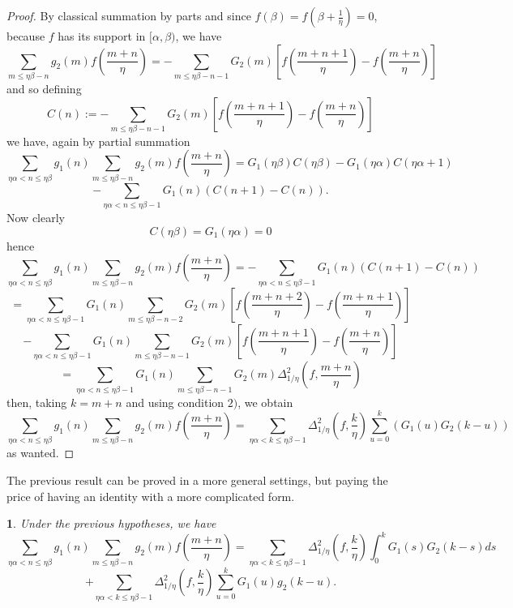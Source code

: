 \documentclass[10pt,a4paper]{amsart}
\numberwithin{equation}{section}
\numberwithin{figure}{section}
\newtheorem{cor}[thm]{\protect\corollaryname}
\providecommand{\corollaryname}{Corollary}
\begin{document}
\begin{proof}
By classical summation by parts and since $f(\beta)=f\left(\beta+\frac{1}{\eta}\right)=0$,
because $f$ has its support in $[\alpha,\beta)$, we have
\[
\sum_{m\leq\eta\beta-n}g_{2}\left(m\right)f\left(\frac{m+n}{\eta}\right)=-\sum_{m\leq\eta\beta-n-1}G_{2}(m)\left[f\left(\frac{m+n+1}{\eta}\right)-f\left(\frac{m+n}{\eta}\right)\right]
\]
and so defining 
\[
C(n):=-\sum_{m\leq\eta\beta-n-1}G_{2}(m)\left[f\left(\frac{m+n+1}{\eta}\right)-f\left(\frac{m+n}{\eta}\right)\right]
\]
we have, again by partial summation
\[
\sum_{\eta\alpha<n\leq\eta\beta}g_{1}\left(n\right)\sum_{m\leq\eta\beta-n}g_{2}\left(m\right)f\left(\frac{m+n}{\eta}\right)=G_{1}\left(\eta\beta\right)C\left(\eta\beta\right)-G_{1}\left(\eta\alpha\right)C\left(\eta\alpha+1\right)
\]
\[
-\sum_{\eta\alpha<n\leq\eta\beta-1}G_{1}\left(n\right)\left(C\left(n+1\right)-C\left(n\right)\right).
\]
Now clearly
\[
C\left(\eta\beta\right)=G_{1}\left(\eta\alpha\right)=0
\]
hence
\[
\sum_{\eta\alpha<n\leq\eta\beta}g_{1}\left(n\right)\sum_{m\leq\eta\beta-n}g_{2}\left(m\right)f\left(\frac{m+n}{\eta}\right)=-\sum_{\eta\alpha<n\leq\eta\beta-1}G_{1}\left(n\right)\left(C\left(n+1\right)-C\left(n\right)\right)
\]
\[
=\sum_{\eta\alpha<n\leq\eta\beta-1}G_{1}\left(n\right)\sum_{m\leq\eta\beta-n-2}G_{2}(m)\left[f\left(\frac{m+n+2}{\eta}\right)-f\left(\frac{m+n+1}{\eta}\right)\right]
\]
\[
-\sum_{\eta\alpha<n\leq\eta\beta-1}G_{1}\left(n\right)\sum_{m\leq\eta\beta-n-1}G_{2}(m)\left[f\left(\frac{m+n+1}{\eta}\right)-f\left(\frac{m+n}{\eta}\right)\right]
\]
\[
=\sum_{\eta\alpha<n\leq\eta\beta-1}G_{1}\left(n\right)\sum_{m\leq\eta\beta-n-1}G_{2}(m)\Delta_{1/\eta}^{2}\left(f,\frac{m+n}{\eta}\right)
\]
then, taking $k=m+n$ and using condition $2)$, we obtain
\[
\sum_{\eta\alpha<n\leq\eta\beta}g_{1}\left(n\right)\sum_{m\leq\eta\beta-n}g_{2}\left(m\right)f\left(\frac{m+n}{\eta}\right)=\sum_{\eta\alpha<k\leq\eta\beta-1}\Delta_{1/\eta}^{2}\left(f,\frac{k}{\eta}\right)\sum_{u=0}^{k}\left(G_{1}(u)G_{2}(k-u)\right)
\]
as wanted.
\end{proof}
%
The previous result can be proved in a more general settings, but
paying the price of having an identity with a more complicated form.
\begin{cor}
\label{cor:discrete}Under the previous hypotheses, we have
\[
\sum_{\eta\alpha<n\leq\eta\beta}g_{1}\left(n\right)\sum_{m\leq\eta\beta-n}g_{2}\left(m\right)f\left(\frac{m+n}{\eta}\right)=\sum_{\eta\alpha<k\leq\eta\beta-1}\Delta_{1/\eta}^{2}\left(f,\frac{k}{\eta}\right)\int_{0}^{k}G_{1}(s)G_{2}(k-s)ds
\]
\[
+\sum_{\eta\alpha<k\leq\eta\beta-1}\Delta_{1/\eta}^{2}\left(f,\frac{k}{\eta}\right)\sum_{u=0}^{k}G_{1}(u)g_{2}(k-u).
\]
\end{cor}
\end{document}
